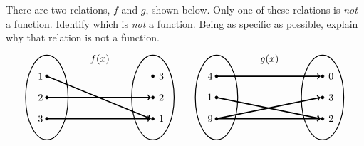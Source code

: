 \documentclass[11pt,letterpaper]{article}
\begin{document}
\problem There are two relations, $f$ and $g$, shown below. Only one of these relations is \textit{not} a function. Identify which is \textit{not} a function. Being as specific as possible, explain why that relation is not a function.
	\[
	\begin{tikzpicture}[scale=0.75]
	\node at (2.5,1.8) {$f(x)$};
	\draw[line width=0.03cm] (0,0) circle (1 and 2);
	\draw[line width=0.03cm] (5,0) circle (1 and 2);
	
	\draw[fill=black] (0,1) circle (0.07);
	\draw[fill=black] (0,0) circle (0.07);
	\draw[fill=black] (0,-1) circle (0.07);
	
	\draw[fill=black] (5,1) circle (0.07);
	\draw[fill=black] (5,0) circle (0.07);
	\draw[fill=black] (5,-1) circle (0.07);
	
	\draw[line width=0.04cm,->] (0,1) -- (4.9,-1);
	\draw[line width=0.04cm,->] (0,0) -- (4.9,0);
	\draw[line width=0.04cm,->] (0,-1) -- (4.9,-1);
	
	\node at (-0.3,1) {$1$};
	\node at (-0.3,0) {$2$};
	\node at (-0.3,-1) {$3$};
	
	\node at (5.4,1) {$3$};
	\node at (5.4,0) {$2$};
	\node at (5.4,-1) {$1$};
	
	\tikzset{shift={(8,0)}}
	\node at (2.5,1.8) {$g(x)$};
	\draw[line width=0.03cm] (0,0) circle (1 and 2);
	\draw[line width=0.03cm] (5,0) circle (1 and 2);
	
	\draw[fill=black] (0,1) circle (0.07);
	\draw[fill=black] (0,0) circle (0.07);
	\draw[fill=black] (0,-1) circle (0.07);
	
	\draw[fill=black] (5,1) circle (0.07);
	\draw[fill=black] (5,0) circle (0.07);
	\draw[fill=black] (5,-1) circle (0.07);
	
	\draw[line width=0.04cm,->] (0,1) -- (4.9,1);
	\draw[line width=0.04cm,->] (0,0) -- (4.9,-1);
	\draw[line width=0.04cm,->] (0,-1) -- (4.9,0);
	\draw[line width=0.04cm,->] (0,-1) -- (4.9,-1);
	
	\node at (-0.3,1) {$4$};
	\node at (-0.5,0) {$-1$};
	\node at (-0.3,-1) {$9$};
	
	\node at (5.4,1) {$0$};
	\node at (5.4,0) {$3$};
	\node at (5.4,-1) {$2$};
	\end{tikzpicture}
	\] \pspace

\end{document}
